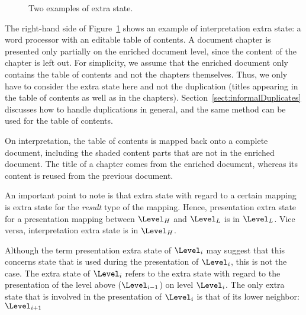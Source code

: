 \begin{figure}
\begin{center}
\begin{center}
\end{center}
\caption{Two examples of extra state.} \label{layerExtraState} 
\end{center}
\end{figure}


The right-hand side of Figure~\ref{layerExtraState} shows an example of interpretation extra state: a word processor with an editable table of contents. A document chapter is presented only partially on the enriched document level, since the content of the chapter is left out. For simplicity, we assume that the enriched document only contains the table of contents and not the chapters themselves. Thus, we only have to consider the extra state here and not the duplication (titles appearing in the table of contents as well as in the chapters). Section~\ref{sect:informalDuplicates} discusses how to handle duplications in general, and the same method can be used for the table of contents.

On interpretation, the table of contents is mapped back onto a complete document, including the shaded content parts that are not in the enriched document. The title of a chapter comes from the enriched document, whereas its content is reused from the previous document. 




\bc
An important point to note is that extra state with regard to a certain mapping is extra state for the {\em result} type of the mapping. Hence, presentation extra state for a presentation mapping between $\Level_{H}$ and $\Level_{L}$ is in $\Level_{L}$. Vice versa, interpretation extra state is in $\Level_{H}$.
\ec

\bc Although the term presentation extra state of $\Level_i$ may suggest that this concerns state that is used during the presentation of $\Level_i$, this is not the case. The extra state of $\Level_i$ refers to the extra state with regard to the presentation of the level above ($\Level_{i-1}$) on level $\Level_i$. The only extra state that is involved in the presentation of $\Level_i$ is that of its lower neighbor: $\Level_{i+1}$
\ec


%																
